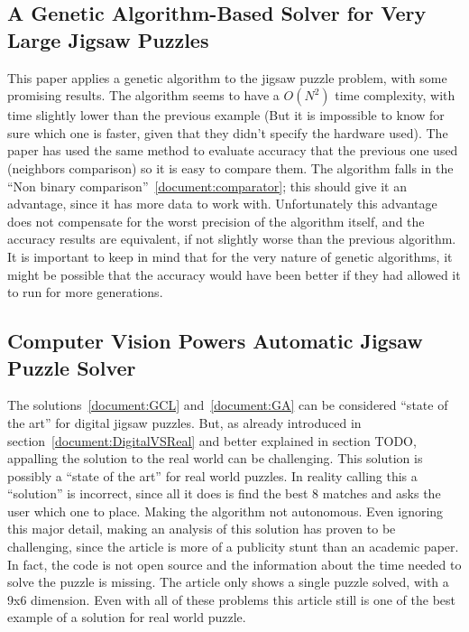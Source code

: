 \documentclass{article}
\begin{document}
\subsection{A Genetic Algorithm-Based Solver for Very Large Jigsaw Puzzles~\cite{GA}}
This paper applies a genetic algorithm to the jigsaw puzzle problem, with some promising results.\newline
The algorithm seems to have a \(O(N^2)\) time complexity, with time slightly lower than the previous example
(But it is impossible to know for sure which one is faster, given that they didn't specify the hardware used).\newline
The paper has used the same method to evaluate accuracy that the previous one used
(neighbors comparison) so it is easy to compare them.\newline
The algorithm falls in the “Non binary comparison”~\ref{document:comparator};
this should give it an advantage, since it has more data to work with.\newline
Unfortunately this advantage does not compensate for the worst precision
of the algorithm itself, and the accuracy results are equivalent,
if not slightly worse than the previous algorithm.\newline
It is important to keep in mind that for the very nature of genetic algorithms,
it might be possible that the accuracy would have been better if they had allowed
it to run for more generations.\newline
\label{document:GA}

\subsection{Computer Vision Powers Automatic Jigsaw Puzzle Solver~\cite{Abto}}
The solutions~\ref{document:GCL} and~\ref{document:GA} can be considered “state of the art” for digital jigsaw puzzles.
But, as already introduced in section~\ref{document:DigitalVSReal} and better explained in section TODO,
appalling the solution to the real world can be challenging.\newline
This solution is possibly a “state of the art” for real world puzzles.\newline
In reality calling this a “solution” is incorrect,
since all it does is find the best 8 matches and asks the user which one to place.
Making the algorithm not autonomous.\newline
Even ignoring this major detail, making an analysis of this solution has proven to be challenging,
since the article is more of a publicity stunt than an academic paper.
In fact, the code is not open source and the information about the time needed to solve the puzzle is missing.\newline
The article only shows a single puzzle solved, with a 9x6 dimension.\newline
Even with all of these problems this article still is one of the best example of a solution for real world puzzle.
\end{document}
